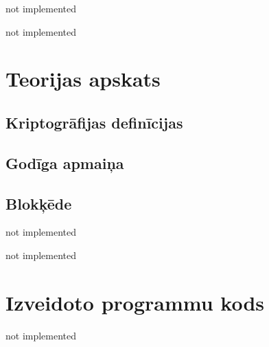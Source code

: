\documentclass[singlespacing, latexmargins]{ludis}
\begin{document}
\maketitle

\begin{abstract-lv}
    not implemented

\end{abstract-lv}

\begin{abstract-en}
    not implemented

\end{abstract-en}

\tableofcontents





\chapter{Teorijas apskats}


\section{Kriptogrāfijas definīcijas}


\section{Godīga apmaiņa}



\section{Blokķēde}


not implemented

not implemented




\appendix
\chapter{Izveidoto programmu kods}
not implemented
\end{document}
